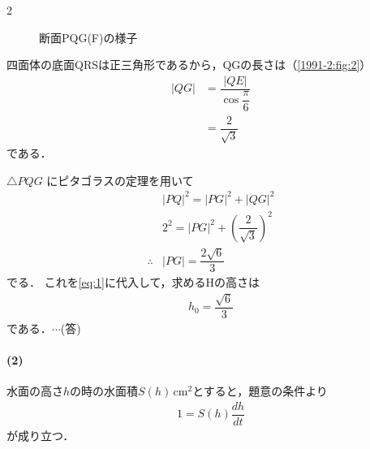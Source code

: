 \documentclass[../../main.tex]{subfiles}
\begin{document}
\begin{multicols}{2}
\begin{figure}[H]
\begin{tikzpicture}[scale=3]
    \end{tikzpicture}
    \caption{断面PQG(F)の様子}
    \label{1991-2:fig:3}
  \end{figure}

  四面体の底面QRSは正三角形であるから，QGの長さは（\cref{1991-2:fig:2}）
  \begin{align}
    |QG|
    & = \dfrac{|QE|}{\cos \dfrac{\pi}{6}} \\
    & = \dfrac{2}{\sqrt{3}}
  \end{align}
  である．

  $\triangle PQG$ にピタゴラスの定理を用いて
  \begin{align}
    & |PQ|^2 = |PG|^2 + |QG|^2                         \\
    & 2^2 = |PG|^2 + \left(\dfrac{2}{\sqrt{3}}\right)^2 \\
    \therefore
    & |PG| = \dfrac{2\sqrt{6}}{3} \label{eq:2}
  \end{align}
  でる．
  これを\cref{eq:1}に代入して，求めるHの高さは
  \begin{align}
    h_0 = \dfrac{\sqrt{6}}{3}
  \end{align}
  である．$\cdots$(答)

  \paragraph{(2)}
  水面の高さ$h$の時の水面積$S(h)\,\mathrm{cm^2}$とすると，題意の条件より
  \begin{align}
    1 = S(h) \dfrac{dh}{dt} \label{eq:3}
  \end{align}
  が成り立つ．

  \begin{figure}[H]
    \centering
\end{figure}
\end{multicols}
\end{document}
